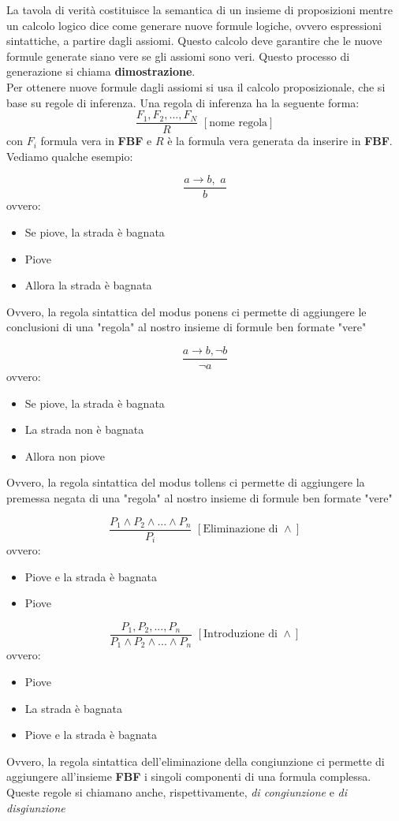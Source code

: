 \documentclass[a4paper,12pt, oneside]{book}
\begin{document}
La tavola di verità costituisce la semantica di un insieme di proposizioni mentre un calcolo logico dice come generare nuove formule logiche, ovvero espressioni sintattiche, a partire dagli assiomi. Questo calcolo deve garantire che le nuove formule generate siano vere se gli assiomi sono veri. Questo processo di generazione si chiama \textbf{dimostrazione}.\\
Per ottenere nuove formule dagli assiomi si usa il calcolo proposizionale, che si base su regole di inferenza. Una regola di inferenza ha la seguente forma:
$$\frac{F_1,F_2,...,F_N}{R}\,\,[\mbox{nome regola}]$$
con $F_i$ formula vera in \textbf{FBF} e $R$ è la formula vera generata da inserire in \textbf{FBF}. Vediamo qualche esempio:
\begin{esempio}
	$$\frac{a\to b,\,\,a}{b}$$
	ovvero:
	\begin{itemize}
		\item Se piove, la strada è bagnata
		\item Piove
		\item Allora la strada è bagnata
	\end{itemize}
	Ovvero, la regola sintattica del modus ponens ci permette di
	aggiungere le conclusioni di una "regola" al nostro insieme di formule ben formate "vere"
\end{esempio}
\begin{esempio}
	$$\frac{a\to b, \neg b}{\neg a}$$
	ovvero:
	\begin{itemize}
		\item Se piove, la strada è bagnata
		\item La strada non è bagnata
		\item Allora non piove
	\end{itemize}
	Ovvero, la regola sintattica del modus tollens ci permette di
	aggiungere la premessa negata di una "regola" al nostro insieme di formule ben formate "vere"
\end{esempio}
\begin{esempio}
	$$\frac{P_1\wedge P_2 \wedge ... \wedge P_n}{P_i}\,\,[\mbox{Eliminazione di }\wedge]$$
	ovvero:
	\begin{itemize}
		\item Piove e la strada è bagnata
		\item Piove
	\end{itemize}
	$$\frac{P_1, P_2,...,P_n}{P_1\wedge P_2 \wedge ... \wedge P_n}\,\,[\mbox{Introduzione di }\wedge]$$
	ovvero:
	\begin{itemize}
		\item Piove
		\item La strada è bagnata
		\item Piove e la strada è bagnata
	\end{itemize}
	Ovvero, la regola sintattica dell'eliminazione della congiunzione ci permette di aggiungere all'insieme \textbf{FBF} i singoli componenti di una formula complessa. \\
	Queste regole si chiamano anche, rispettivamente, \textit{di congiunzione} e \textit{di disgiunzione}
\end{esempio}
\end{document}
